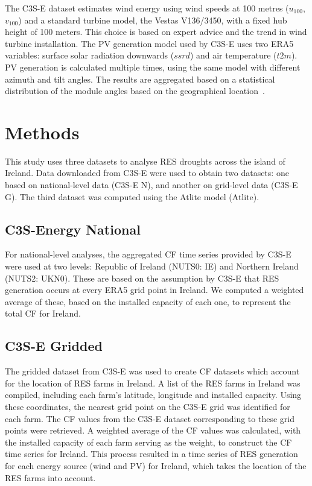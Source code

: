 \documentclass[a4paper, 11p1t]{article}
\begin{document}
The C3S-E dataset estimates wind energy using wind speeds at 100 metres ($u_{100}$, $v_{100}$) and a standard turbine model, the Vestas V136/3450, with a fixed hub height of 100 meters. This choice is based on expert advice and the trend in wind turbine installation. The PV generation model used by C3S-E uses two ERA5 variables: surface solar radiation downwards ($ssrd$) and air temperature ($t2m$). PV generation is calculated multiple times, using the same model with different azimuth and tilt angles. The results are aggregated based on a statistical distribution of the module angles based on the geographical location~\cite{saintdrenan2018solar}.

\section{Methods}
\label{sec:Methods}

This study uses three datasets to analyse RES droughts across the island of Ireland. Data downloaded from C3S-E were used to obtain two datasets: one based on national-level data (C3S-E N), and another on grid-level data (C3S-E G). The third dataset was computed using the Atlite model (Atlite).

\subsection{C3S-Energy National}
\label{sec:c3se_n}

For national-level analyses, the aggregated CF time series provided by C3S-E were used at two levels: Republic of Ireland (NUTS0: IE) and Northern Ireland (NUTS2: UKN0). These are based on the assumption by C3S-E that RES generation occurs at every ERA5 grid point in Ireland. We computed a weighted average of these, based on the installed capacity of each one, to represent the total CF for Ireland.

\subsection{C3S-E Gridded}
\label{sec:c3se_g}

The gridded dataset from C3S-E was used to create CF datasets which account for the location of RES farms in Ireland. A list of the RES farms in Ireland was compiled, including each farm’s latitude, longitude and installed capacity. Using these coordinates, the nearest grid point on the C3S-E grid was identified for each farm. The CF values from the C3S-E dataset corresponding to these grid points were retrieved. A weighted average of the CF values was calculated, with the installed capacity of each farm serving as the weight, to construct the CF time series for Ireland. This process resulted in a time series of RES generation for each energy source (wind and PV) for Ireland, which takes the location of the RES farms into account.
\end{document}

